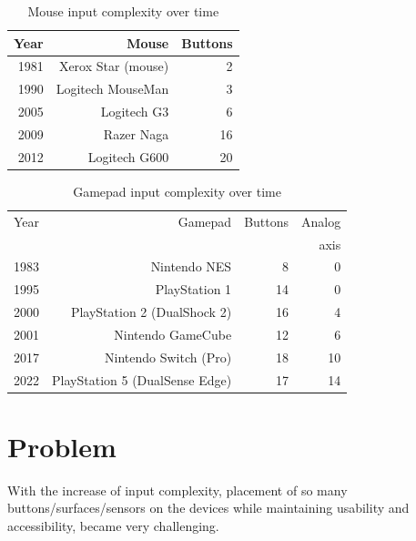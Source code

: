 \documentclass[10pt, twocolumn, a4paper]{article}
\begin{document}
    \begin{table}[H]
        \centering
        \small
        \caption{Mouse input complexity over time}
        \vspace{2mm}
        \begin{tabular}{|r|r|r|}
            \hline
                Year & Mouse & Buttons \\
            \hline
                1981 & Xerox Star (mouse) & 2 \\
                1990 & Logitech MouseMan & 3 \\
                2005 & Logitech G3 & 6 \\
                2009 & Razer Naga & 16 \\
                2012 & Logitech G600 & 20 \\
            \hline
        \end{tabular}
    \end{table}

    \vspace{-5mm}
    \begin{table}[H]
        \centering
        \small
        \caption{Gamepad input complexity over time}
        \vspace{2mm}
        \begin{tabular}{|r|r|r|r|}
            \hline
                Year & Gamepad & Buttons & Analog \\
                     &         &         & axis \\
            \hline
                1983 & Nintendo NES & 8 & 0 \\
                1995 & PlayStation 1 & 14 & 0 \\
                2000 & PlayStation 2 (DualShock 2) & 16 & 4 \\
                2001 & Nintendo GameCube & 12 & 6 \\
                2017 & Nintendo Switch (Pro) & 18 & 10 \\
                2022 & PlayStation 5 (DualSense Edge) & 17 & 14 \\
            \hline
        \end{tabular}
    \end{table}


\pagebreak
\section{Problem}
    With the increase of input complexity, placement of so many buttons/surfaces/sensors on the devices while maintaining usability and accessibility, became very challenging.
\end{document}
